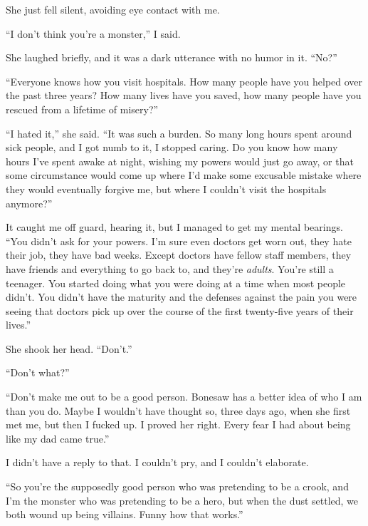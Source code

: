 She just fell silent, avoiding eye contact with me.



``I don't think you're a monster,'' I said.



She laughed briefly, and it was a dark utterance with no humor in it.  ``No?''



``Everyone knows how you visit hospitals.  How many people have you helped over the past three years?  How many lives have you saved, how many people have you rescued from a lifetime of misery?''



``I hated it,'' she said.  ``It was such a burden.  So many long hours spent around sick people, and I got numb to it, I stopped caring.  Do you know how many hours I've spent awake at night, wishing my powers would just go away, or that some circumstance would come up where I'd make some excusable mistake where they would eventually forgive me, but where I couldn't visit the hospitals anymore?''



It caught me off guard, hearing it, but I managed to get my mental bearings.  ``You didn't ask for your powers.  I'm sure even doctors get worn out, they hate their job, they have bad weeks.  Except doctors have fellow staff members, they have friends and everything to go back to, and they're \emph{adults}.  You're still a teenager.  You started doing what you were doing at a time when most people didn't.  You didn't have the maturity and the defenses against the pain you were seeing that doctors pick up over the course of the first twenty-five years of their lives.''



She shook her head.  ``Don't.''



``Don't what?''



``Don't make me out to be a good person.  Bonesaw has a better idea of who I am than you do.  Maybe I wouldn't have thought so, three days ago, when she first met me, but then I fucked up.  I proved her right.  Every fear I had about being like my dad came true.''



I didn't have a reply to that.  I couldn't pry, and I couldn't elaborate.



``So you're the supposedly good person who was pretending to be a crook, and I'm the monster who was pretending to be a hero, but when the dust settled, we both wound up being villains.  Funny how that works.''



